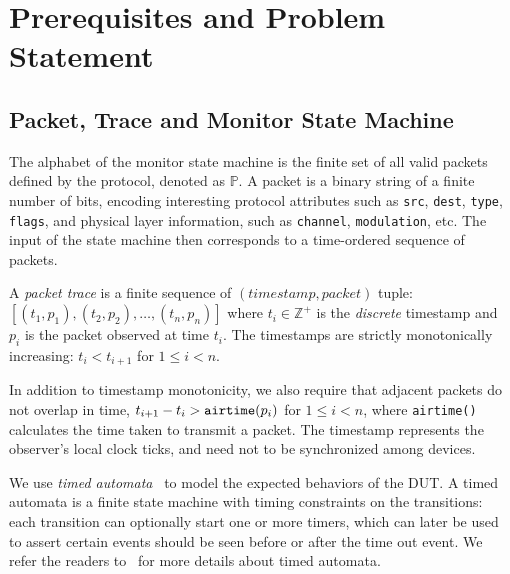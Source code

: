 \section{Prerequisites and Problem Statement}
\label{sec:background}

\subsection{Packet, Trace and Monitor State Machine}
\label{subsec:basic}

The alphabet of the monitor state machine is the finite set of all valid packets
defined by the protocol, denoted as $\mathbb{P}$.  A packet is a binary string
of a finite number of bits, encoding interesting protocol attributes such as
\texttt{src}, \texttt{dest}, \texttt{type}, \texttt{flags}, and physical layer
information, such as \texttt{channel}, \texttt{modulation}, etc. The input of
the state machine then corresponds to a time-ordered sequence of packets.

\begin{definition}
  A \textit{packet trace} is a finite sequence of $(timestamp, packet)$ tuple:
  $[(t_1, p_1), (t_2, p_2),\ldots,(t_n, p_n)]$ where $t_i \in \mathbb{Z}^+$ is
  the \textit{discrete} timestamp and $p_i$ is the packet observed at time
  $t_i$. The timestamps are strictly monotonically increasing: $t_i < t_{i+1}$
  for $1 \le i < n$.
\end{definition}%

In addition to timestamp monotonicity, we also require that adjacent packets do
not overlap in time, $t_{i+1}-t_i > \text{\texttt{airtime}}(p_i)$ for $1 \le i <
n$, where \texttt{airtime()} calculates the time taken to transmit a packet.
The timestamp represents the observer's local clock ticks, and need not to be
synchronized among devices.

We use \textit{timed automata}~\cite{alur1994theory} to model the expected
behaviors of the DUT. A timed automata is a finite state machine with timing
constraints on the transitions: each transition can optionally start one or more
timers, which can later be used to assert certain events should be seen before
or after the time out event. We refer the readers to~\cite{alur1994theory} for
more details about timed automata.


